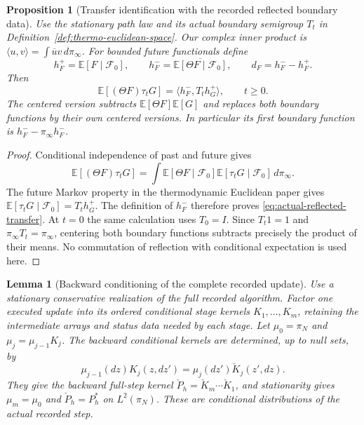 \documentclass[11pt]{article}
\newtheorem{proposition}[theorem]{Proposition}
\newtheorem{lemma}[theorem]{Lemma}
\theoremstyle{definition}
\theoremstyle{remark}
\begin{document}
\begin{proposition}[Transfer identification with the recorded reflected boundary data]
\label{prop:transfer-identification}
Use the stationary path law and its actual boundary semigroup $T_t$ in
Definition~\ref{def:thermo-euclidean-space}. Our complex inner product is
$\langle u,v\rangle=\int\overline u v\,d\pi_\infty$.
For bounded future functionals define
\[
h_F^+=\mathbb E[F\mid\mathcal F_0],\qquad
h_F^-=\overline{\mathbb E[\Theta F\mid\mathcal F_0]},\qquad
d_F=h_F^--h_F^+.
\]
Then
\begin{equation}
\mathbb E[(\Theta F)\tau_tG]=\langle h_F^-,T_t h_G^+\rangle,
\qquad t\ge0.
\label{eq:actual-reflected-transfer}
\end{equation}
The centered version subtracts
$\mathbb E[\Theta F]\mathbb E[G]$ and replaces both boundary functions
by their own centered versions. In particular its first boundary function
is $h_F^--\pi_\infty h_F^-$.
\end{proposition}

\begin{proof}
Conditional independence of past and future gives
\[
\mathbb E[(\Theta F)\tau_tG]
=\int\mathbb E[\Theta F\mid\mathcal F_0]
       \mathbb E[\tau_tG\mid\mathcal F_0]\,d\pi_\infty.
\]
The future Markov property in the thermodynamic Euclidean paper gives
$\mathbb E[\tau_tG\mid\mathcal F_0]=T_t h_G^+$.
The definition of $h_F^-$ therefore proves
\eqref{eq:actual-reflected-transfer}. At $t=0$ the same calculation uses
$T_0=I$. Since $T_t1=1$ and $\pi_\infty T_t=\pi_\infty$, centering both
boundary functions subtracts precisely the product of their means.
No commutation of reflection with conditional expectation is used here.
\end{proof}

\begin{lemma}[Backward conditioning of the complete recorded update]
\label{lem:recorded-backward-update}
Use a stationary conservative realization of the full recorded algorithm.
Factor one executed update into its ordered conditional stage kernels
$K_1,\ldots,K_m$, retaining the intermediate arrays and status data needed
by each stage. Let $\mu_0=\pi_N$ and $\mu_j=\mu_{j-1}K_j$.
The backward conditional kernels are determined, up to null sets, by
\begin{equation}
\mu_{j-1}(dz)K_j(z,dz')=\mu_j(dz')\check K_j(z',dz).
\label{eq:recorded-stage-reversal}
\end{equation}
They give the backward full-step kernel
$\check P_h=\check K_m\cdots\check K_1$, and stationarity gives
$\mu_m=\mu_0$ and $\check P_h=P_h^*$ on $L^2(\pi_N)$.
These are conditional distributions of the actual recorded step.
\end{lemma}
\end{document}
